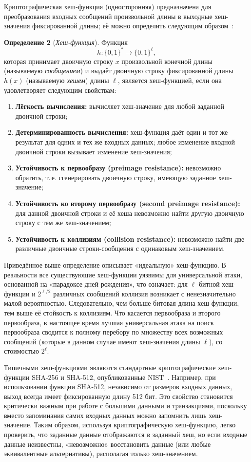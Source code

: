 Криптографическая хеш-функция (односторонняя) предназначена для преобразования входных сообщений произвольной длины в выходные хеш-значения фиксированной длины; её можно определить следующим образом~\cite{7}:

\textbf{Определение 2} (\textit{Хеш-функция}). Функция
\[
h:\{0,1\}^{\ast}\rightarrow \{0,1\}^{\ell},
\]
которая принимает двоичную строку \(x\) произвольной конечной длины (называемую \emph{сообщением}) и выдаёт двоичную строку фиксированной длины \(h(x)\) (называемую \emph{хешем}) длины \(\ell\), является хеш-функцией, если она удовлетворяет следующим свойствам:
\begin{enumerate}
\item \textbf{Лёгкость вычисления:} вычисляет хеш-значение для любой заданной двоичной строки;
\item \textbf{Детерминированность вычисления:} хеш-функция даёт один и тот же результат для одних и тех же входных данных; любое изменение входной двоичной строки вызывает изменение хеш-значения;
\item \textbf{Устойчивость к первообразу (preimage resistance):} невозможно обратить, т.\,е. сгенерировать двоичную строку, имеющую заданное хеш-значение;
\item \textbf{Устойчивость ко второму первообразу (second preimage resistance):} для данной двоичной строки и её хеша невозможно найти другую двоичную строку с тем же хеш-значением;
\item \textbf{Устойчивость к коллизиям (collision resistance):} невозможно найти две различные двоичные строки-сообщения с одинаковым хеш-значением.
\end{enumerate}

Приведённое выше определение описывает «идеальную» хеш-функцию. В реальности все существующие хеш-функции уязвимы для универсальной атаки, основанной на «парадоксе дней рождения», что означает: для \(\ell\)-битной хеш-функции и \(2^{\ell/2}\) различных сообщений коллизия возникает с ненезначительно малой вероятностью. Следовательно, чем больше битовая длина хеш-функции, тем выше её стойкость к коллизиям. Что касается первообраза и второго первообраза, в настоящее время лучшая универсальная атака на поиск первообраза сводится к полному перебору по множеству всех возможных сообщений (которые в данном случае имеют хеш-значения длины \(\ell\)), со стоимостью \(2^{\ell}\).

Типичными хеш-функциями являются стандартные криптографические хеш-функции SHA-256 и SHA-512, опубликованные NIST~\cite{6}. Например, при использовании функции SHA-512, независимо от размеров входных данных, выход всегда имеет фиксированную длину 512 бит. Это свойство становится критически важным при работе с большими данными и транзакциями, поскольку вместо запоминания самих входных данных можно запомнить лишь хеш-значение. Таким образом, используя криптографическую хеш-функцию, легко проверить, что заданные данные отображаются в заданный хеш, но если входные данные неизвестны, «невозможно» восстановить данные (или любые эквивалентные альтернативы), располагая только хеш-значением.

